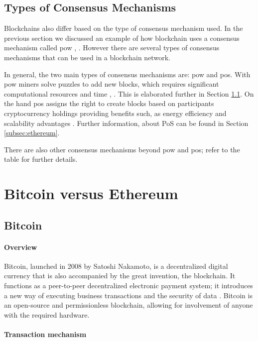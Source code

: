 \subsection{Types of Consensus Mechanisms}

Blockchains also differ based on the type of consensus mechanism used. In the previous section we discussed an example of how blockchain uses a consensus mechanism called 
\gls{pow} \cite{9752154}, \cite{10037907}. However there are several types of consensus mechanisms that can be used in a blockchain network. 

In general, the two main types of consensus mechanisms are: \gls{pow} and \gls{pos}. With \gls{pow} miners solve puzzles to add new blocks, which requires significant 
computational resources and time \cite{9752154}, \cite{10037907}. This is elaborated further in Section \ref{subsec:bitcoin}. On the hand \gls{pos} assigns the right 
to create blocks based on participants cryptocurrency holdings providing benefits such, as energy efficiency and scalability advantages \cite{10037907}. Further information,
about PoS can be found in Section \ref{subsec:ethereum}.

There are also other consensus mechanisms beyond \gls{pow} and \gls{pos}; refer to the table for further details.

\section{Bitcoin versus Ethereum}

\subsection{Bitcoin} \label{subsec:bitcoin}

\paragraph{Overview}

Bitcoin, launched in 2008 by Satoshi Nakamoto, is a decentralized digital currency that is also accompanied by the great invention, the blockchain. It functions as a 
peer-to-peer decentralized electronic payment system; it introduces a new way of executing business transactions and the security of data \cite{9129332}. Bitcoin is an open-source 
and permissionless blockchain, allowing for involvement of anyone with the required hardware.

\paragraph{Transaction mechanism}

